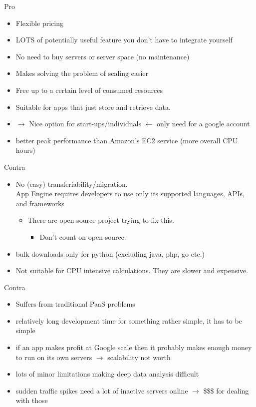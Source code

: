 \documentclass{beamer}
\begin{document}
\begin{frame}{Pro}
	\begin{itemize}
		\item Flexible pricing
		\item LOTS of potentially useful feature you don't have to integrate yourself
		\item No need to buy servers or server space (no maintenance)
		\item Makes solving the problem of scaling easier
		\item Free up to a certain level of consumed resources
		\item Suitable for apps that just store and retrieve data.
				\item $\rightarrow$  Nice option for start-ups/individuals $\leftarrow$ only need for a google account
		\item better peak performance than Amazon's EC2 service (more overall CPU hours)

	\end{itemize}
	
\end{frame}
\begin{frame}{Contra}
	\begin{itemize}
		\item No (easy) transferiability/migration. \\
		App Engine requires developers to use only its supported languages, APIs, and frameworks
		\begin{itemize}
		   \item There are open source project trying to fix this. 
		   \begin{itemize}
		   	\item Don't count on open source.
		   \end{itemize}
		\end{itemize}
	\item bulk downloads only for python (excluding java, php, go etc.)
	\item Not suitable for CPU intensive calculations. They are slower and expensive.	
	\end{itemize}
\end{frame}
\begin{frame}{Contra}
\begin{itemize}
	\item Suffers from traditional PaaS problems 
		\item relatively long development time for something rather simple, it has to be simple 
		\item if an app makes profit at Google scale then it probably  makes enough money to run on its own servers $\rightarrow$ scalability not worth
		\item lots of minor limitations making deep data analysis difficult
		\item sudden traffic spikes need a lot of inactive servers online $\rightarrow$ \$\$\$			for dealing with those		
	\end{itemize}
\end{frame}
\end{document}
